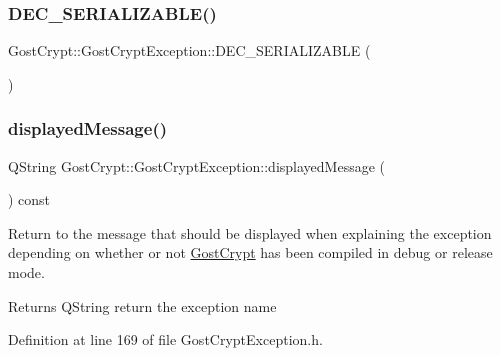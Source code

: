 \subsubsection{\texorpdfstring{D\+E\+C\+\_\+\+S\+E\+R\+I\+A\+L\+I\+Z\+A\+B\+L\+E()}{DEC\_SERIALIZABLE()}}
{\footnotesize\ttfamily Gost\+Crypt\+::\+Gost\+Crypt\+Exception\+::\+D\+E\+C\+\_\+\+S\+E\+R\+I\+A\+L\+I\+Z\+A\+B\+LE (\begin{DoxyParamCaption}\item[{\hyperlink{class_gost_crypt_1_1_gost_crypt_exception}{Gost\+Crypt\+Exception}}]{ }\end{DoxyParamCaption})\hspace{0.3cm}{\ttfamily [protected]}}

\mbox{\label{class_gost_crypt_1_1_gost_crypt_exception_a69ae9972b73e6f7e9bc72b2ec4d4901b}} 
\subsubsection{\texorpdfstring{displayed\+Message()}{displayedMessage()}}
{\footnotesize\ttfamily Q\+String Gost\+Crypt\+::\+Gost\+Crypt\+Exception\+::displayed\+Message (\begin{DoxyParamCaption}{ }\end{DoxyParamCaption}) const\hspace{0.3cm}{\ttfamily [inline]}}



Return to the message that should be displayed when explaining the exception depending on whether or not \hyperlink{namespace_gost_crypt}{Gost\+Crypt} has been compiled in debug or release mode. 

\begin{DoxyReturn}{Returns}
Q\+String return the exception name 
\end{DoxyReturn}


Definition at line 169 of file Gost\+Crypt\+Exception.\+h.

\mbox{\label{class_gost_crypt_1_1_gost_crypt_exception_a3f390fae2e7330b75dd1297f749a2439}} 
